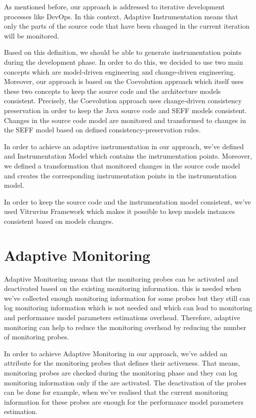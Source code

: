 As mentioned before, our approach is addressed to iterative development processes like DevOps. In this context, Adaptive Instrumentation means that only the parts of the source code that have been changed in the current iteration will be monitored. 

Based on this definition, we should be able to generate instrumentation points during the development phase. In order to do this, we decided to use two main concepts which are model-driven engineering and change-driven engineering. Moreover, our approach is based on the Coevolution approach which itself uses these two concepts to keep the source code and the architecture models consistent. Precisely, the Coevolution approach uses change-driven consistency preservation in order to keep the Java source code and SEFF models consistent. Changes in the source code model are monitored and transformed to changes in the SEFF model based on defined consistency-preservation rules. 

In order to achieve an adaptive instrumentation in our approach, we’ve defined and Instrumentation Model which contains the instrumentation points. Moreover, we defined a transformation that monitored changes in the source code model and creates the corresponding instrumentation points in the instrumentation model. 

In order to keep the source code and the instrumentation model consistent, we've used Vitruvius Framework which makes it possible to keep models instances consistent based on models changes. 

\section{Adaptive Monitoring}
\label{sec:Adaptive Monitoring}
Adaptive Monitoring means that the monitoring probes can be activated and deactivated based on the existing monitoring information. this is needed when we’ve collected enough monitoring information for some probes but they still can log monitoring information which is not needed and which can lead to monitoring and performance model parameters estimations overhead.  Therefore, adaptive monitoring can help to reduce the monitoring overhead by reducing the number of monitoring probes. 

In order to achieve Adaptive Monitoring in our approach, we've added an attribute for the monitoring probes that defines their activeness. That means, monitoring probes are checked during the monitoring phase and they can log monitoring information only if the are activated. The deactivation of the probes can be done for example, when we've realised that the current monitoring information for these probes are enough for the performance model parameters estimation.

